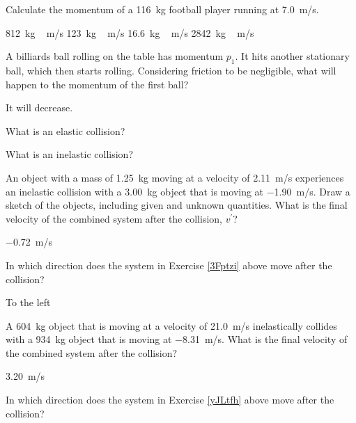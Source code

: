 \documentclass[]{exam}
\begin{document}
\begin{questions}
\question %
Calculate the momentum of a \SI{116}{kg} football player running at \SI{7.0}{m/s}. 

\begin{randomizechoices}
    \correctchoice \SI{812}{kg\,m/s}
    \choice \SI{123}{kg\,m/s}
    \choice \SI{16.6}{kg\,m/s}
    \choice \SI{2842}{kg\,m/s}
\end{randomizechoices}


\question \label{yEzMEO}
A billiards ball rolling on the table has momentum $p_1$. It hits another stationary ball, which then starts rolling. Considering friction to be negligible, what will happen to the momentum of the first ball?

\begin{solution}
It will decrease.
\end{solution}





\question \label{rhrGbz}
What is an elastic collision?



\question \label{Hjk6xk}
What is an inelastic collision?


\question \label{3Fptzi}
An object with a mass of \SI{1.25}{kg} moving at a velocity of \SI{2.11}{m/s} experiences an inelastic collision with a \SI{3.00}{kg} object that is moving at \SI{-1.90}{m/s}. Draw a sketch of the objects, including given and unknown quantities. What is the final velocity of the combined system after the collision, $v^{\prime}$? 

\begin{solution}
\SI{-0.72}{m/s}
\end{solution}


\question \label{17GLnY}
In which direction does the system in Exercise \ref{3Fptzi} above move after the collision?

\begin{solution}
To the left
\end{solution}


\question \label{yJLtfh}
A \SI{604}{kg} object that is moving at a velocity of \SI{21.0}{m/s} inelastically collides with a \SI{934}{kg} object that is moving at \SI{-8.31}{m/s}. What is the final velocity of the combined system after the collision?

\begin{solution}
\SI{3.20}{m/s}
\end{solution}


\question \label{ViY0SX}
In which direction does the system in Exercise \ref{yJLtfh} above move after the collision?


\end{questions}
\end{document}
